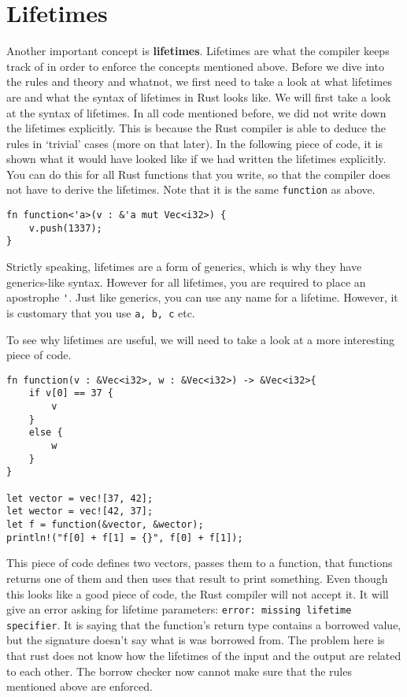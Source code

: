 \section{Lifetimes}
Another important concept is \textbf{lifetimes}. 
Lifetimes are what the compiler keeps track of in order to enforce the concepts mentioned above. Before we dive into the rules and theory and whatnot, we first need to take a look at what lifetimes are and what the syntax of lifetimes in Rust looks like. 
We will first take a look at the syntax of lifetimes. In all code mentioned before, we did not write down the lifetimes explicitly. This is because the Rust compiler is able to deduce the rules in `trivial' cases (more on that later). In the following piece of code, it is shown what it would have looked like if we had written the lifetimes explicitly. You can do this for all Rust functions that you write, so that the compiler does not have to derive the lifetimes. Note that it is the same \verb|function| as above. 

\begin{verbatim}
fn function<'a>(v : &'a mut Vec<i32>) {
    v.push(1337);
}
\end{verbatim}

Strictly speaking, lifetimes are a form of generics, which is why they have generics-like syntax.  However for all lifetimes, you are required to place an apostrophe \verb|'|. Just like generics, you can use any name for a lifetime. However, it is customary that you use \verb|a, b, c| etc. 

To see why lifetimes are useful, we will need to take a look at a more interesting piece of code. 

\begin{verbatim}
fn function(v : &Vec<i32>, w : &Vec<i32>) -> &Vec<i32>{
    if v[0] == 37 {
        v
    }
    else {
        w
    }
}

let vector = vec![37, 42];
let wector = vec![42, 37];
let f = function(&vector, &wector);
println!("f[0] + f[1] = {}", f[0] + f[1]);
\end{verbatim}

This piece of code defines two vectors, passes them to a function, that functions returns one of them and then uses that result to print something. Even though this looks like a good piece of code, the Rust compiler will not accept it. It will give an error asking for lifetime parameters: \texttt{error: missing lifetime specifier}. It is saying that the function's return type contains a borrowed value, but the signature doesn't say what is was borrowed from. The problem here is that rust does not know how the lifetimes of the input and the output are related to each other. The borrow checker now cannot make sure that the rules mentioned above are enforced. 

